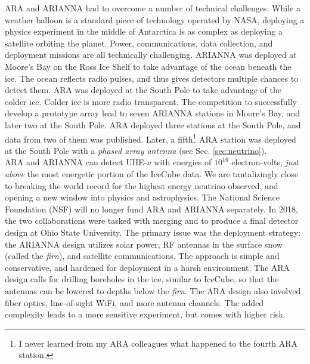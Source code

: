 \documentclass[../../../main.tex]{subfiles}
\begin{document}
\vspace{0.25cm}
ARA and ARIANNA had to overcome a number of technical challenges.  While a weather balloon is a standard piece of technology operated by NASA, deploying a physics experiment in the middle of Antarctica is as complex as deploying a satellite orbiting the planet.  Power, communications, data collection, and deployment missions are all technically challenging.  ARIANNA was deployed at Moore's Bay on the Ross Ice Shelf to take advantage of the ocean beneath the ice.  The ocean reflects radio pulses, and thus gives detectors multiple chances to detect them.  ARA was deployed at the South Pole to take advantage of the colder ice.  Colder ice is more radio transparent.  The competition to successfully develop a prototype array lead to seven ARIANNA stations in Moore's Bay, and later two at the South Pole.  ARA deployed three stations at the South Pole, and data from two of them was published.  Later, a fifth\footnote{I never learned from my ARA colleagues what happened to the fourth ARA station.} ARA station was deployed at the South Pole with a \textit{phased array antenna} (see Sec. \ref{sec:neutrino}).
\\
\vspace{0.25cm}
ARA and ARIANNA can detect UHE-$\nu$ with energies of $10^{16}$ electron-volts, \textit{just above} the most energetic portion of the IceCube data.  We are tantalizingly close to breaking the world record for the highest energy neutrino observed, and opening a new window into physics and astrophysics.  The National Science Foundation (NSF) will no longer fund ARA and ARIANNA separately.  In 2018, the two collaborations were tasked with merging and to produce a final detector design at Ohio State University.  The primary issue was the deployment strategy: the ARIANNA design utilizes solar power, RF antennas in the surface snow (called the \textit{firn}), and satellite communications.  The approach is simple and conservative, and hardened for deployment in a harsh environment.  The ARA design calls for drilling boreholes in the ice, similar to IceCube, so that the antennas can be lowered to depths below the \textit{firn}.  The ARA design also involved fiber optics, line-of-sight WiFi, and more antenna channels.  The added complexity leads to a more sensitive experiment, but comes with higher risk.
\\
\vspace{0.25cm}
\end{document}
